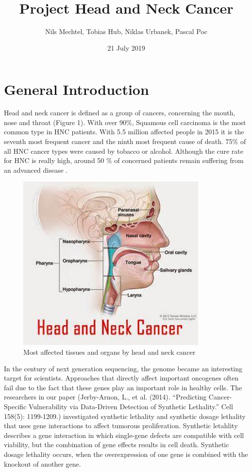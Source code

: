 \documentclass[]{article}
\title{Project Head and Neck Cancer}
\author{Nils Mechtel, Tobias Hub, Niklas Urbanek, Pascal Poc}
\date{21 July 2019}
\begin{document}
\maketitle

\section{General Introduction}\label{general-introduction}

Head and neck cancer is defined as a group of cancers, concerning the
mouth, nose and throat (Figure 1). With over 90\%, Squamous cell
carcinoma is the most common type in HNC patients. With 5.5 million
affected people in 2015 it is the seventh most frequent cancer and the
ninth most frequent cause of death. 75\% of all HNC cancer types were
caused by tobacco or alcohol. Although the cure rate for HNC is really
high, around 50 \% of concerned patients remain suffering from an
advanced disease .

\begin{figure}
\centering
\includegraphics{images/HNC_Kopf.png}
\caption{Most affected tissues and organs by head and neck cancer}
\end{figure}

In the century of next generation sequencing, the genome became an
interesting target for scientists. Approaches that directly affect
important oncogenes often fail due to the fact that these genes play an
important role in healthy cells. The researchers in our paper
(Jerby-Arnon, L., et al. (2014). ``Predicting Cancer-Specific
Vulnerability via Data-Driven Detection of Synthetic Lethality.'' Cell
158(5): 1199-1209.) investigated synthetic lethality and synthetic
dosage lethality that uses gene interactions to affect tumorous
proliferation. Synthetic letahlity describes a gene interaction in which
single-gene defects are compatible with cell viability, but the
combination of gene effects results in cell death. Synthetic dosage
lethality occurs, when the overexpression of one gene is combined with
the knockout of another gene.
\end{document}
